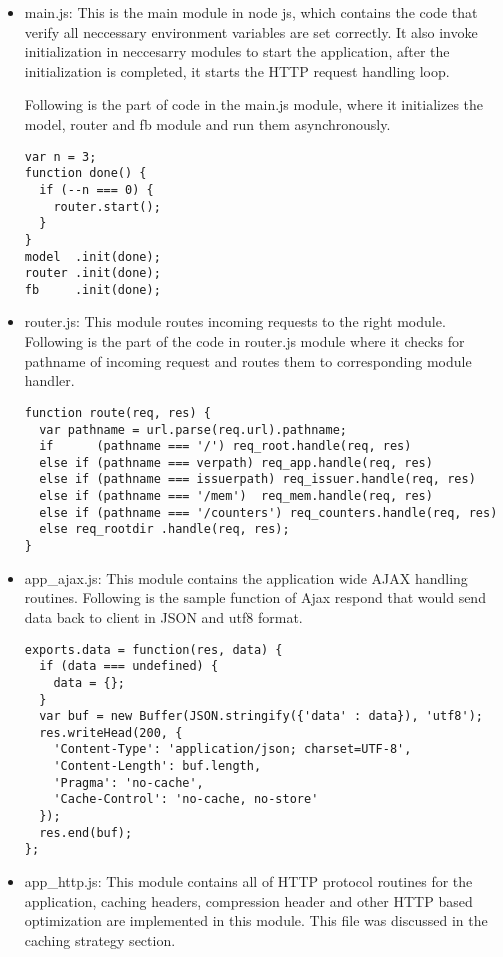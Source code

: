 \begin{itemize}
\item main.js: This is the main module in node js, which contains the code that verify all neccessary environment variables are set correctly. It also invoke initialization in neccesarry modules to start the application, after the initialization is completed, it starts the HTTP request handling loop. 

Following is the part of code in the main.js module, where it initializes the model, router and fb module and run them asynchronously. 
\begin{lstlisting}
var n = 3;
function done() {
  if (--n === 0) {
    router.start();
  }  
}
model  .init(done);
router .init(done);
fb     .init(done);
\end{lstlisting} 

\item router.js: This module routes incoming requests to the right module. Following is the part of the code in router.js module where it checks for pathname of incoming request and routes them to corresponding module handler.
\begin{lstlisting}
function route(req, res) {
  var pathname = url.parse(req.url).pathname;
  if      (pathname === '/') req_root.handle(req, res)
  else if (pathname === verpath) req_app.handle(req, res)
  else if (pathname === issuerpath) req_issuer.handle(req, res)
  else if (pathname === '/mem')  req_mem.handle(req, res)
  else if (pathname === '/counters') req_counters.handle(req, res)
  else req_rootdir .handle(req, res);
}
\end{lstlisting} 


\item app{\_}ajax.js: This module contains the application wide AJAX handling routines. Following is the sample function of Ajax respond that would send data back to client in JSON and utf8 format.
\begin{lstlisting}
exports.data = function(res, data) {
  if (data === undefined) {
    data = {};
  }
  var buf = new Buffer(JSON.stringify({'data' : data}), 'utf8');
  res.writeHead(200, {
    'Content-Type': 'application/json; charset=UTF-8',
    'Content-Length': buf.length,
    'Pragma': 'no-cache',
    'Cache-Control': 'no-cache, no-store'
  });
  res.end(buf);
};
\end{lstlisting} 


\item app{\_}http.js: This module contains all of HTTP protocol routines for the application, caching headers, compression header and other HTTP based optimization are implemented in this module. This file was discussed in the caching strategy section.


\end{itemize}
